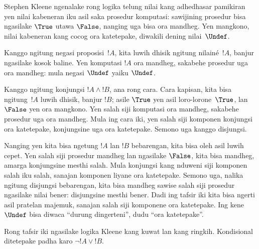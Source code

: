 \documentclass[../../../include/open-logic-section]{subfiles}
\begin{document}


Stephen Kleene ngenalake rong logika telung nilai kang adhedhasar
pamikiran yen nilai kabeneran iku asil saka prosedur komputasi:
sawijining prosedur bisa ngasilake $\True$ utawa $\False$, nanging
uga bisa ora mandheg. Yen mangkono, nilai kabeneran kang cocog ora
katetepake, diwakili dening nilai~$\Undef$.

Kanggo ngitung negasi proposisi~$!A$, kita luwih dhisik ngitung
nilainé~$!A$, banjur ngasilake kosok baline. Yen komputasi $!A$
ora mandheg, sakabehe prosedur uga ora mandheg: mula negasi
$\Undef$ yaiku $\Undef$.

Kanggo ngitung konjungsi $!A \land !B$, ana rong cara. Cara kapisan,
kita bisa ngitung~$!A$ luwih dhisik, banjur $!B$; asile $\True$
yen asil loro-lorone~$\True$, lan $\False$ yen ora mangkono.
Yen salah siji komputasi ora mandheg, sakabehe prosedur uga ora
mandheg. Mula ing cara iki, yen salah siji komponen konjungsi
ora katetepake, konjungsine uga ora katetepake. Semono uga
kanggo disjungsi.

Nanging yen kita bisa ngetung $!A$ lan $!B$ bebarengan,
kita bisa oleh asil luwih cepet. Yen salah siji prosedur mandheg
lan ngasilake $\False$, kita bisa mandheg, amarga konjungsine
mesthi salah. Mula konjungsi kang nduweni siji komponen salah
iku salah, sanajan komponen liyane ora katetepake. Semono uga,
nalika ngitung disjungsi bebarengan, kita bisa mandheg sawise
salah siji prosedur ngasilake nilai bener: disjungsine mesthi
bener. Dadi ing tafsir iki kita bisa ngerti asil pratelan majemuk,
sanajan salah siji komponene ora katetepake. Ing kene $\Undef$
bisa diwaca ``durung dingerteni'', dudu ``ora katetepake''.

Rong tafsir iki ngasilake logika Kleene kang kuwat lan kang
ringkih. Kondisional ditetepake padha karo $\lnot !A \lor !B$.
\end{document}
